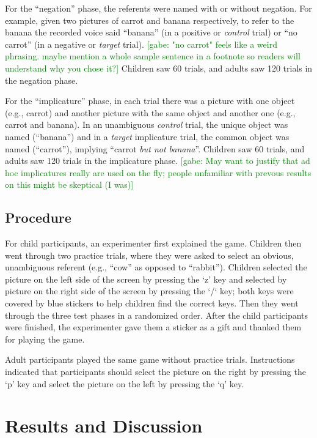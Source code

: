 \documentclass[10pt,letterpaper]{article}
\newcommand{\gabe}[1]{\textcolor{Green}{[gabe: #1]}}
\begin{document}
For the ``negation'' phase, the referents were named with or without negation. For example, given two pictures of carrot and banana respectively, to refer to the banana the recorded voice said ``banana'' (in a positive or \emph{control} trial) or ``no carrot'' (in a negative or \emph{target} trial). \gabe{"no carrot" feels like a weird phrasing. maybe mention a whole sample sentence in a footnote so readers will understand why you chose it?} Children saw 60 trials, and adults saw 120 trials in the negation phase. 

For the ``implicature'' phase, in each trial there was a picture with one object (e.g., carrot) and another picture with the same object and another one (e.g., carrot and banana). In an unambiguous \emph{control} trial, the unique object was named (``banana'') and in a \emph{target} implicature trial, the common object was named (``carrot''), implying ``carrot \emph{but not banana}''. Children saw 60 trials, and adults saw 120 trials in the implicature phase. \gabe{May want to justify that ad hoc implicatures really are used on the fly; people unfamiliar with prevous results on this might be skeptical (I was)}

\subsection{Procedure}

For child participants, an experimenter first explained the game.  Children then went through two practice trials, where they were asked to select an obvious, unambiguous referent (e.g., ``cow'' as opposed to ``rabbit'').  Children selected the picture on the left side of the screen by pressing the `z' key and selected by picture on the right side of the screen by pressing the `/` key; both keys were covered by blue stickers to help children find the correct keys. Then they went through the three test phases in a randomized order.  After the child participants were finished, the experimenter gave them a sticker as a gift and thanked them for playing the game.

Adult participants played the same game without practice trials.  Instructions indicated that participants should select the picture on the right by pressing the `p' key and select the picture on the left by pressing the `q' key.  

\section{Results and Discussion}
\end{document}
